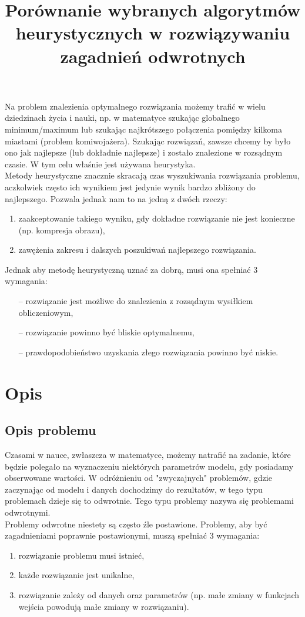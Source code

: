 \documentclass[twoside]{projektInzynierskiMS1}
\title{Porównanie wybranych algorytmów heurystycznych w rozwiązywaniu zagadnień odwrotnych}
\newcommand{\si}{ś}
\begin{document}
Na problem znalezienia optymalnego rozwiązania możemy trafić w wielu dziedzinach życia i nauki, np. w matematyce szukając globalnego minimum/maximum lub szukając najkrótszego połączenia pomiędzy kilkoma miastami (problem komiwojażera). Szukając rozwiązań, zawsze chcemy by było ono jak najlepsze (lub dokładnie najlepsze) i zostało znalezione w rozsądnym czasie. W tym celu wła\si nie jest używana heurystyka.\\ 


Metody heurystyczne znacznie skracają czas wyszukiwania rozwiązania problemu, aczkolwiek często ich wynikiem jest jedynie wynik bardzo zbliżony do najlepszego. Pozwala jednak nam to na jedną z dwóch rzeczy:
\begin{enumerate}
	\item zaakceptowanie takiego wyniku, gdy dokładne rozwiązanie nie jest konieczne (np. kompresja obrazu),
	\item zawężenia zakresu i dalszych poszukiwań najlepszego rozwiązania. \\
\end{enumerate}
Jednak aby metodę heurystyczną uznać za dobrą, musi ona spełniać 3 wymagania:
\begin{itemize}
	\item[--] rozwiązanie jest możliwe do znalezienia z rozsądnym wysiłkiem obliczeniowym,
	\item[--] rozwiązanie powinno być bliskie optymalnemu,
	\item[--] prawdopodobieństwo uzyskania złego rozwiązania powinno być niskie.
\end{itemize}

\section{Opis}
\subsection{Opis problemu}
Czasami w nauce, zwłaszcza w matematyce, możemy natrafić na zadanie, które będzie polegało na wyznaczeniu niektórych parametrów modelu, gdy posiadamy obserwowane warto\si ci. W odróżnieniu od "zwyczajnych" problemów, gdzie zaczynając od modelu i danych dochodzimy do rezultatów, w tego typu problemach dzieje się to odwrotnie. Tego typu problemy nazywa się problemami odwrotnymi. \\

Problemy odwrotne niestety są często źle postawione. Problemy, aby być zagadnieniami poprawnie postawionymi, muszą spełniać 3 wymagania:
\begin{enumerate}
	\item rozwiązanie problemu musi istnieć,
	\item każde rozwiązanie jest unikalne,
	\item rozwiązanie zależy od danych oraz parametrów (np. małe zmiany w funkcjach wej\si cia powodują małe zmiany w rozwiązaniu). \\
\end{enumerate}
\end{document}
